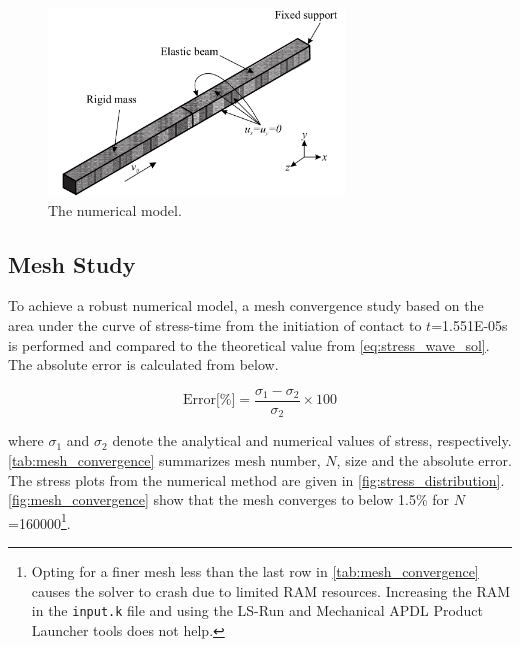 \documentclass{article}
\begin{document}
\begin{figure}[H]
    \centering
    \includegraphics[width = 0.7\textwidth ]{figures/mesh_quality.pdf}
    \caption{The numerical model.}
    \label{fig:mesh_quality}
\end{figure}

\subsection{Mesh Study}
To achieve a robust numerical model, a mesh convergence study based on the area under the curve of stress-time from the initiation of contact to $t$=1.551E-05s is performed and compared to the theoretical value from \cref{eq:stress_wave_sol}. The absolute error is calculated from below. 

\begin{equation}
    \text{Error[\%]} = \frac{\sigma_1 - \sigma_2}{\sigma_2} \times 100
    \label{eq:error}
\end{equation}

where $\sigma_1$ and $\sigma_2$ denote the analytical and numerical values of stress, respectively. \cref{tab:mesh_convergence} summarizes mesh number, $N$, size and the absolute error. The stress plots from the numerical method are given in \cref{fig:stress_distribution}. \cref{fig:mesh_convergence} show that the mesh converges to below 1.5\% for $N$=160000\footnote{Opting for a finer mesh less than the last row in \cref{tab:mesh_convergence} causes the solver to crash due to limited RAM resources. Increasing the RAM in the \texttt{input.k} file and using the LS-Run and Mechanical APDL Product Launcher tools does not help.}. 
\end{document}
